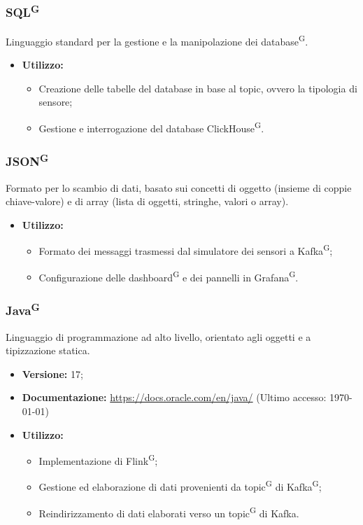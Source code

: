 \documentclass[8pt]{article}
\newcommand{\glossterm}[1]{#1\textsuperscript{G}} %
\begin{document}
\subsubsection{\glossterm{SQL}}
Linguaggio standard per la gestione e la manipolazione dei \glossterm{database}.
\begin{itemize}
	\setlength\itemsep{0em}
    \item \textbf{Utilizzo:}
    \begin{itemize}
	\setlength\itemsep{0em}
        \item Creazione delle tabelle del database in base al topic, ovvero la tipologia di sensore;
        \item Gestione e interrogazione del database \glossterm{ClickHouse}.
    \end{itemize}
\end{itemize}
\subsubsection{\glossterm{JSON}}
Formato per lo scambio di dati, basato sui concetti di oggetto (insieme di coppie chiave-valore) e di array (lista di oggetti, stringhe, valori o array).
\begin{itemize}
	\setlength\itemsep{0em}
    \item \textbf{Utilizzo:}
    \begin{itemize}
	\setlength\itemsep{0em}
        \item Formato dei messaggi trasmessi dal simulatore dei sensori a \glossterm{Kafka};
        \item Configurazione delle \glossterm{dashboard} e dei pannelli in \glossterm{Grafana}.
    \end{itemize}
\end{itemize}
\subsubsection{\glossterm{Java}}
Linguaggio di programmazione ad alto livello, orientato agli oggetti e a tipizzazione statica.
\begin{itemize}
	\setlength\itemsep{0em}
    \item \textbf{Versione:} 17;
    \item \textbf{Documentazione:} \href{https://docs.oracle.com/en/java/}{\color{myblue}https://docs.oracle.com/en/java/} (Ultimo accesso: \today)
    \item \textbf{Utilizzo:}
    \begin{itemize}
	\setlength\itemsep{0em}
        \item Implementazione di \glossterm{Flink};
        \item Gestione ed elaborazione di dati provenienti da \glossterm{topic} di \glossterm{Kafka};
        \item Reindirizzamento di dati elaborati verso un \glossterm{topic} di Kafka.
    \end{itemize}
\end{itemize}
\end{document}
